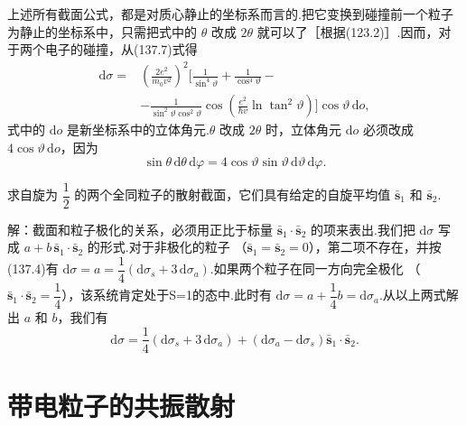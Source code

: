 上述所有截面公式，都是对质心静止的坐标系而言的.把它变换到碰撞前一个粒子为静止的坐标系中，只需把式中的 $\theta$ 改成 $2\theta$ 就可以了［根据(123.2)］.因而，对于两个电子的碰撞，从(137.7)式得
\begin{equation}
\begin{aligned}
  \mathrm{d}\sigma={}&\left(\frac{2e^2}{m_0v^2}\right)^{2}
  \biggl[\frac{1}{\sin^4\vartheta}+\frac{1}{\cos^4\vartheta}-\\
  &-\frac{1}{\sin^2\vartheta\cos^2\vartheta}
  \cos\left(\frac{e^2}{\hbar v}\ln\tan^2\vartheta\right)
  \biggr]\cos\vartheta\,\mathrm{d}o,
\end{aligned}
\end{equation}
式中的 $\mathrm{d}o$ 是新坐标系中的立体角元.$\theta$ 改成 $2\theta$ 时，立体角元 $\mathrm{d}o$ 必须改成 $4\cos\vartheta\,\mathrm{d}o$，因为
\begin{equation*}
  \sin\theta\,\mathrm{d}\theta\,\mathrm{d}\varphi
  =4\cos\vartheta\sin\vartheta\,\mathrm{d}\vartheta\,\mathrm{d}\varphi.
\end{equation*}

\begin{xiti}

\quad 求自旋为 $\dfrac{1}{2}$ 的两个全同粒子的散射截面，它们具有给定的自旋平均值 $\bar{\boldsymbol{s}}_1$ 和 $\bar{\boldsymbol{s}}_2$.

解：截面和粒子极化的关系，必须用正比于标量
$\bar{\boldsymbol{s}}_1\cdot\bar{\boldsymbol{s}}_2$ 的项来表出.我们把 $\mathrm{d}\sigma$ 写成
$a+b\,\bar{\boldsymbol{s}}_1\cdot\bar{\boldsymbol{s}}_2$ 的形式.对于非极化的粒子
（$\bar{\boldsymbol{s}}_1=\bar{\boldsymbol{s}}_2=0$），第二项不存在，并按(137.4)有
$\mathrm{d}\sigma=a=\dfrac{1}{4}(\mathrm{d}\sigma_s+3\,\mathrm{d}\sigma_a)$.如果两个粒子在同一方向完全极化
（$\bar{\boldsymbol{s}}_1\cdot\bar{\boldsymbol{s}}_2=\dfrac{1}{4}$），该系统肯定处于S=1的态中.此时有
$\mathrm{d}\sigma=a+\dfrac{1}{4}b=\mathrm{d}\sigma_a$.从以上两式解出 $a$ 和 $b$，我们有
\begin{equation*}
  \mathrm{d}\sigma=\frac{1}{4}
  \left(\mathrm{d}\sigma_s+3\,\mathrm{d}\sigma_a\right)
  +\left(\mathrm{d}\sigma_a-\mathrm{d}\sigma_s\right)
  \bar{\boldsymbol{s}}_1\cdot\bar{\boldsymbol{s}}_2.
\end{equation*}

\end{xiti}

\section{带电粒子的共振散射}

